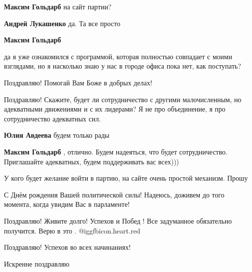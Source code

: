 \begin{itemize}
\begin{itemize}
\textbf{Максим Гольдарб} на сайт партии?

\textbf{Андрей Лукашенко} да. Та все просто

\textbf{Максим Гольдарб} 

да я уже ознакомился с программой, которая полностью совпадает с моими
взглядами, но я насколько знаю у нас в городе офиса пока нет, как поступать?

\end{itemize} %

Поздравляю!
Помогай Вам Боже в добрых делах!


Поздравляю! Скажите, будет ли сотрудничество с другими малочисленным, но
адекватными движениями и с их лидерами? Я не про объединение, я про
сотрудничество адекватных сил.

\begin{itemize} %
\textbf{Юлия Авдеева} будем только рады

\textbf{Максим Гольдарб} , отлично. Будем надеяться, что будет сотрудничество. Приглашайте адекватных, будем поддерживать вас всех)))
\end{itemize} %

У кого будет желание войти в партию, на сайте очень простой механизм. Прошу

С Днём рождения Вашей политической силы! Надеюсь, доживем до того момента, когда увидим Вас в парламенте!

Поздравляю! Живите долго! Успехов и Побед ! Все задуманное обязательно получится. Верю в это . @igg{fbicon.heart.red}

Поздравляю! Успехов во всех начинаниях!

Искренне поздравляю

\end{itemize} %
